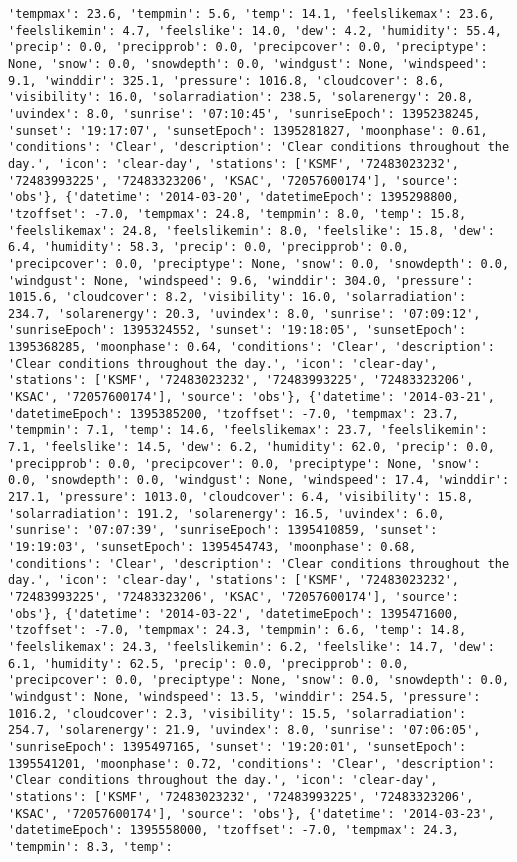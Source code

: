 \documentclass[
  letterpaper,
  DIV=11,
  numbers=noendperiod]{scrartcl}
\begin{document}
\begin{verbatim}
'tempmax': 23.6, 'tempmin': 5.6, 'temp': 14.1, 'feelslikemax': 23.6, 'feelslikemin': 4.7, 'feelslike': 14.0, 'dew': 4.2, 'humidity': 55.4, 'precip': 0.0, 'precipprob': 0.0, 'precipcover': 0.0, 'preciptype': None, 'snow': 0.0, 'snowdepth': 0.0, 'windgust': None, 'windspeed': 9.1, 'winddir': 325.1, 'pressure': 1016.8, 'cloudcover': 8.6, 'visibility': 16.0, 'solarradiation': 238.5, 'solarenergy': 20.8, 'uvindex': 8.0, 'sunrise': '07:10:45', 'sunriseEpoch': 1395238245, 'sunset': '19:17:07', 'sunsetEpoch': 1395281827, 'moonphase': 0.61, 'conditions': 'Clear', 'description': 'Clear conditions throughout the day.', 'icon': 'clear-day', 'stations': ['KSMF', '72483023232', '72483993225', '72483323206', 'KSAC', '72057600174'], 'source': 'obs'}, {'datetime': '2014-03-20', 'datetimeEpoch': 1395298800, 'tzoffset': -7.0, 'tempmax': 24.8, 'tempmin': 8.0, 'temp': 15.8, 'feelslikemax': 24.8, 'feelslikemin': 8.0, 'feelslike': 15.8, 'dew': 6.4, 'humidity': 58.3, 'precip': 0.0, 'precipprob': 0.0, 'precipcover': 0.0, 'preciptype': None, 'snow': 0.0, 'snowdepth': 0.0, 'windgust': None, 'windspeed': 9.6, 'winddir': 304.0, 'pressure': 1015.6, 'cloudcover': 8.2, 'visibility': 16.0, 'solarradiation': 234.7, 'solarenergy': 20.3, 'uvindex': 8.0, 'sunrise': '07:09:12', 'sunriseEpoch': 1395324552, 'sunset': '19:18:05', 'sunsetEpoch': 1395368285, 'moonphase': 0.64, 'conditions': 'Clear', 'description': 'Clear conditions throughout the day.', 'icon': 'clear-day', 'stations': ['KSMF', '72483023232', '72483993225', '72483323206', 'KSAC', '72057600174'], 'source': 'obs'}, {'datetime': '2014-03-21', 'datetimeEpoch': 1395385200, 'tzoffset': -7.0, 'tempmax': 23.7, 'tempmin': 7.1, 'temp': 14.6, 'feelslikemax': 23.7, 'feelslikemin': 7.1, 'feelslike': 14.5, 'dew': 6.2, 'humidity': 62.0, 'precip': 0.0, 'precipprob': 0.0, 'precipcover': 0.0, 'preciptype': None, 'snow': 0.0, 'snowdepth': 0.0, 'windgust': None, 'windspeed': 17.4, 'winddir': 217.1, 'pressure': 1013.0, 'cloudcover': 6.4, 'visibility': 15.8, 'solarradiation': 191.2, 'solarenergy': 16.5, 'uvindex': 6.0, 'sunrise': '07:07:39', 'sunriseEpoch': 1395410859, 'sunset': '19:19:03', 'sunsetEpoch': 1395454743, 'moonphase': 0.68, 'conditions': 'Clear', 'description': 'Clear conditions throughout the day.', 'icon': 'clear-day', 'stations': ['KSMF', '72483023232', '72483993225', '72483323206', 'KSAC', '72057600174'], 'source': 'obs'}, {'datetime': '2014-03-22', 'datetimeEpoch': 1395471600, 'tzoffset': -7.0, 'tempmax': 24.3, 'tempmin': 6.6, 'temp': 14.8, 'feelslikemax': 24.3, 'feelslikemin': 6.2, 'feelslike': 14.7, 'dew': 6.1, 'humidity': 62.5, 'precip': 0.0, 'precipprob': 0.0, 'precipcover': 0.0, 'preciptype': None, 'snow': 0.0, 'snowdepth': 0.0, 'windgust': None, 'windspeed': 13.5, 'winddir': 254.5, 'pressure': 1016.2, 'cloudcover': 2.3, 'visibility': 15.5, 'solarradiation': 254.7, 'solarenergy': 21.9, 'uvindex': 8.0, 'sunrise': '07:06:05', 'sunriseEpoch': 1395497165, 'sunset': '19:20:01', 'sunsetEpoch': 1395541201, 'moonphase': 0.72, 'conditions': 'Clear', 'description': 'Clear conditions throughout the day.', 'icon': 'clear-day', 'stations': ['KSMF', '72483023232', '72483993225', '72483323206', 'KSAC', '72057600174'], 'source': 'obs'}, {'datetime': '2014-03-23', 'datetimeEpoch': 1395558000, 'tzoffset': -7.0, 'tempmax': 24.3, 'tempmin': 8.3, 'temp': 
\end{verbatim}
\end{document}
